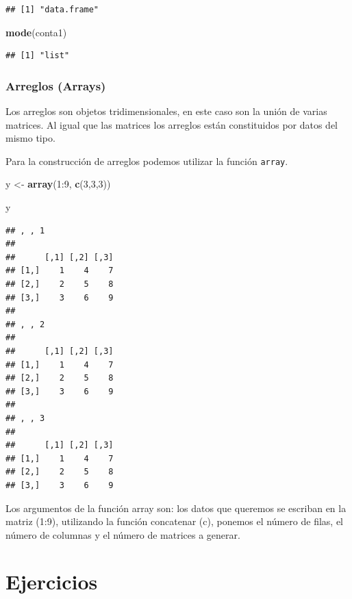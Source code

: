 \documentclass[]{article}
\newenvironment{Shaded}{\begin{snugshade}}{\end{snugshade}}
\newcommand{\KeywordTok}[1]{\textcolor[rgb]{0.13,0.29,0.53}{\textbf{{#1}}}}
\newcommand{\DecValTok}[1]{\textcolor[rgb]{0.00,0.00,0.81}{{#1}}}
\newcommand{\StringTok}[1]{\textcolor[rgb]{0.31,0.60,0.02}{{#1}}}
\newcommand{\NormalTok}[1]{{#1}}
\begin{document}
\begin{verbatim}
## [1] "data.frame"
\end{verbatim}

\begin{Shaded}
\begin{Highlighting}[]
\KeywordTok{mode}\NormalTok{(conta1)}
\end{Highlighting}
\end{Shaded}

\begin{verbatim}
## [1] "list"
\end{verbatim}

\subsubsection{Arreglos (Arrays)}\label{arreglos-arrays}

Los arreglos son objetos tridimensionales, en este caso son la unión de
varias matrices. Al igual que las matrices los arreglos están
constituidos por datos del mismo tipo.

Para la construcción de arreglos podemos utilizar la función
\texttt{array}.

\begin{Shaded}
\begin{Highlighting}[]
\NormalTok{y <-}\StringTok{ }\KeywordTok{array}\NormalTok{(}\DecValTok{1}\NormalTok{:}\DecValTok{9}\NormalTok{, }\KeywordTok{c}\NormalTok{(}\DecValTok{3}\NormalTok{,}\DecValTok{3}\NormalTok{,}\DecValTok{3}\NormalTok{))}

\NormalTok{y}
\end{Highlighting}
\end{Shaded}

\begin{verbatim}
## , , 1
## 
##      [,1] [,2] [,3]
## [1,]    1    4    7
## [2,]    2    5    8
## [3,]    3    6    9
## 
## , , 2
## 
##      [,1] [,2] [,3]
## [1,]    1    4    7
## [2,]    2    5    8
## [3,]    3    6    9
## 
## , , 3
## 
##      [,1] [,2] [,3]
## [1,]    1    4    7
## [2,]    2    5    8
## [3,]    3    6    9
\end{verbatim}

Los argumentos de la función array son: los datos que queremos se
escriban en la matriz (1:9), utilizando la función concatenar (c),
ponemos el número de filas, el número de columnas y el número de
matrices a generar.

\section{Ejercicios}\label{ejercicios}
\end{document}
